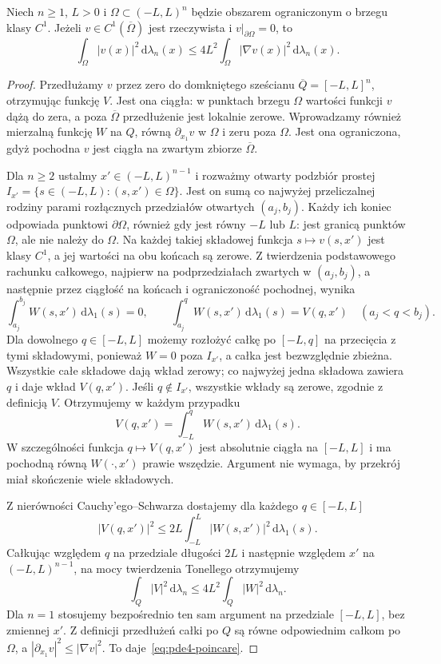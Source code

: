 \begin{lemat}
\label{lem:pde4-poincare}
Niech $n\geq1$, $L>0$ i $\Omega\subset(-L,L)^n$
będzie obszarem ograniczonym o brzegu klasy $C^1$.
Jeżeli $v\in C^1(\overline\Omega)$ jest rzeczywista
i $v|_{\partial\Omega}=0$, to
\begin{equation}\label{eq:pde4-poincare}
 \int_\Omega |v(x)|^2\,\mathrm d\lambda_n(x)
 \leq4L^2\int_\Omega|\nabla v(x)|^2\,\mathrm d\lambda_n(x).
\end{equation}
\end{lemat}
\begin{proof}
Przedłużamy $v$ przez zero do domkniętego sześcianu
$\overline Q=[-L,L]^n$, otrzymując funkcję $V$.
Jest ona ciągła: w punktach brzegu $\Omega$
wartości funkcji $v$ dążą do zera, a poza
$\overline\Omega$ przedłużenie jest lokalnie zerowe.
Wprowadzamy również mierzalną funkcję $W$ na $Q$,
równą $\partial_{x_1}v$ w $\Omega$ i zeru poza
$\Omega$. Jest ona ograniczona, gdyż pochodna
$v$ jest ciągła na zwartym zbiorze $\overline\Omega$.

Dla $n\geq2$ ustalmy $x'\in(-L,L)^{n-1}$
i rozważmy otwarty podzbiór prostej
$I_{x'}=\{s\in(-L,L):(s,x')\in\Omega\}$.
Jest on sumą co najwyżej przeliczalnej rodziny
parami rozłącznych przedziałów otwartych $(a_j,b_j)$.
Każdy ich koniec odpowiada punktowi $\partial\Omega$,
również gdy jest równy $-L$ lub $L$:
jest granicą punktów $\Omega$, ale nie należy
do $\Omega$. Na każdej takiej składowej funkcja
$s\mapsto v(s,x')$ jest klasy $C^1$, a jej wartości
na obu końcach są zerowe. Z twierdzenia podstawowego
rachunku całkowego, najpierw na podprzedziałach
zwartych w $(a_j,b_j)$, a następnie przez
ciągłość na końcach i ograniczoność pochodnej,
wynika
\[
 \int_{a_j}^{b_j}W(s,x')\,\mathrm d\lambda_1(s)=0,
 \qquad
 \int_{a_j}^{q}W(s,x')\,\mathrm d\lambda_1(s)=V(q,x')
 \quad(a_j<q<b_j).
\]
Dla dowolnego $q\in[-L,L]$ możemy rozłożyć całkę
po $[-L,q]$ na przecięcia z tymi składowymi,
ponieważ $W=0$ poza $I_{x'}$, a całka jest
bezwzględnie zbieżna. Wszystkie całe składowe
dają wkład zerowy; co najwyżej jedna składowa
zawiera $q$ i daje wkład $V(q,x')$.
Jeśli $q\notin I_{x'}$, wszystkie wkłady są zerowe,
zgodnie z definicją $V$. Otrzymujemy w każdym przypadku
\[
 V(q,x')=\int_{-L}^{q}W(s,x')\,\mathrm d\lambda_1(s).
\]
W szczególności funkcja $q\mapsto V(q,x')$ jest
absolutnie ciągła na $[-L,L]$ i ma pochodną
równą $W(\cdot,x')$ prawie wszędzie.
Argument nie wymaga, by przekrój miał skończenie
wiele składowych.

Z nierówności Cauchy'ego--Schwarza dostajemy
dla każdego $q\in[-L,L]$
\[
 |V(q,x')|^2\leq 2L
 \int_{-L}^L|W(s,x')|^2\,\mathrm d\lambda_1(s).
\]
Całkując względem $q$ na przedziale długości $2L$
i następnie względem $x'$ na $(-L,L)^{n-1}$,
na mocy twierdzenia Tonellego otrzymujemy
\[
 \int_Q |V|^2\,\mathrm d\lambda_n
 \leq4L^2\int_Q|W|^2\,\mathrm d\lambda_n.
\]
Dla $n=1$ stosujemy bezpośrednio ten sam argument
na przedziale $[-L,L]$, bez zmiennej $x'$.
Z definicji przedłużeń całki po $Q$ są równe
odpowiednim całkom po $\Omega$, a
$|\partial_{x_1}v|^2\leq|\nabla v|^2$.
To daje~\eqref{eq:pde4-poincare}.
\end{proof}

